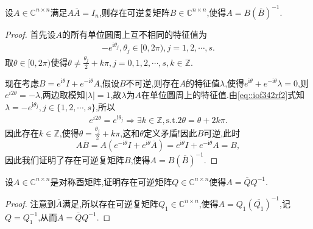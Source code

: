 \documentclass[../../main.tex]{subfiles}%
\begin{document}
\begin{theorem}\label{theorem:定理1354846135}
设\( A \in \mathbb{C}^{n \times n} \)满足\( A \overline{A} = I_n \),则存在可逆复矩阵\( B \in \mathbb{C}^{n \times n} \),使得\( A = B (\overline{B})^{-1} \).
\end{theorem}
\begin{proof}
首先设\( A \)的所有单位圆周上互不相同的特征值为
\begin{align}
-e^{\mathrm{i}\theta _j}, \theta_j \in [0, 2\pi), j = 1, 2, \cdots, s.\label{eq::iof342rf2}
\end{align}
取\( \theta \in [0, 2\pi) \)使得\( \theta \neq \frac{\theta_j}{2} + k\pi, j = 0, 1, 2, \cdots, s, k \in \mathbb{Z} \).

现在考虑\( B = e^{\mathrm{i}\theta } I + e^{-\mathrm{i}\theta } A \),假设$B$不可逆,则存在\( A \)的特征值\( \lambda \),使得\( e^{\mathrm{i}\theta } + e^{-\mathrm{i}\theta } \lambda = 0 \),则\( e^{i2\theta} = -\lambda \),两边取模知$|\lambda|=1$,故$\lambda$为$A$在单位圆周上的特征值.由\eqref{eq::iof342rf2}式知\( \lambda = -e^{\mathrm{i}\theta _j}, j \in \{1, 2, \cdots, s\} \),所以
\begin{align}
e^{i2\theta}=e^{\mathrm{i}\theta _j}\Longrightarrow \exists k\in \mathbb{Z},\mathrm{s}.\mathrm{t}.  2\theta=\theta + 2k\pi.
\end{align}
因此存在\( k \in \mathbb{Z} \),使得\( \theta = \frac{\theta_j}{2} + k\pi \),这和\( \theta \)定义矛盾!因此\( B \)可逆,此时
\[
A \overline{B} = A \left( e^{-\mathrm{i}\theta } I + e^{\mathrm{i}\theta } \overline{A} \right) = e^{\mathrm{i}\theta } I + e^{-\mathrm{i}\theta } A = B,
\]
因此我们证明了存在可逆复矩阵\( B \),使得\( A = B (\overline{B})^{-1} \).
\end{proof}

\begin{proposition}
设\( A \in \mathbb{C}^{n \times n} \)是对称酉矩阵,证明存在可逆矩阵\( Q \in \mathbb{C}^{n \times n} \)使得\( A = \overline{Q} Q^{-1} \).
\end{proposition}
\begin{proof}
注意到\( \overline{A} \)满足,所以存在可逆复矩阵\( Q_1 \in \mathbb{C}^{n \times n} \),使得\( A = Q_1 (\overline{Q_1})^{-1} \),记$Q=Q_1^{-1}$,从而\( A = \overline{Q} Q^{-1} \).
\end{proof}
\end{document}
